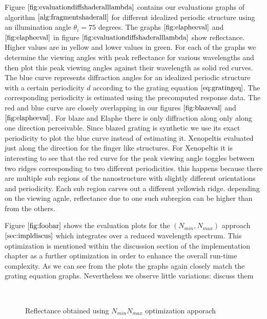 Figure $\ref{fig:evaluationdiffshaderalllambda}$ contains our evaluations graphs of algorithm $\ref{alg:fragmentshaderall}$ for different idealized periodic structure using an illumination angle $\theta_i = 75$ degrees. The graphs $\ref{fig:elapheeval}$ and $\ref{fig:elapheeval}$ in figure $\ref{fig:evaluationdiffshaderalllambda}$ show reflectance. Higher values are in yellow and lower values in green. For each of the graphs we determine the viewing angles with peak reflectance for various wavelengths and then plot this peak viewing angles against their wavelength as solid red curves. The blue curve represents diffraction angles for an idealized periodic structure with a certain periodicity $d$ according to the grating equation $\ref{eq:gratingeq}$. The corresponding periodicity is estimated using the precomputed response data. The red and blue curve are closely overlapping in our figures $\ref{fig:blazeval}$ and $\ref{fig:elapheeval}$. For blaze and Elaphe there is only diffraction along only along one direction perceivable. Since blazed grating is synthetic we use its exact periodicity to plot the blue curve instead of estimating it. Xenopeltis evaluated just along the direction for the finger like structures. For Xenopeltis it is interesting to see that the red curve for the peak viewing angle toggles between two ridges corresponding to two different periodicities. this happens because there are multiple sub regions of the nanostructure with slightly different orientations and periodicity. Each sub region carves out a different yellowish ridge. depending on the viewing agnle, reflectance due to one such subregion can be higher than from the others.

Figure $\ref{fig:foobar}$ shows the evaluation plots for the $(N_{min},N_{max})$ approach $\ref{sec:impldiscus}$ which integrates over a reduced wavelength spectrum. This optimization is mentioned within the discussion section of the implementation chapter as a further optimization in order to enhance the overall run-time complexity. As we can see from the plots the graphs again closely match the grating equation graphs. Nevertheless we observe little variations: discuss them

\begin{figure}[H]
  \centering
~
\caption{Reflectance obtained using $N_{min} N_{max}$ optimization apporach}
\label{fig:evaluationdiffshadernminmax}
\end{figure}


